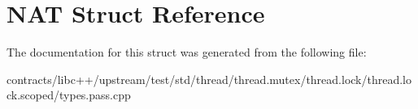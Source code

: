 \hypertarget{struct_n_a_t}{}\section{N\+AT Struct Reference}
\label{struct_n_a_t}


The documentation for this struct was generated from the following file\+:\begin{DoxyCompactItemize}
\item 
contracts/libc++/upstream/test/std/thread/thread.\+mutex/thread.\+lock/thread.\+lock.\+scoped/types.\+pass.\+cpp\end{DoxyCompactItemize}
